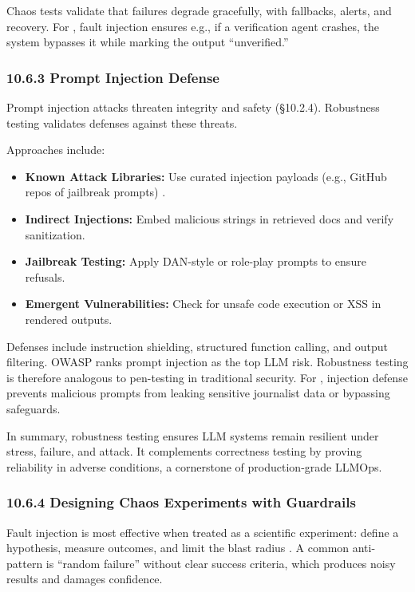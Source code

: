 Chaos tests validate that failures degrade gracefully, with fallbacks, alerts, and recovery. For \ishtar{}, fault injection ensures e.g., if a verification agent crashes, the system bypasses it while marking the output “unverified.”  

\subsubsection*{10.6.3 Prompt Injection Defense}
Prompt injection attacks threaten integrity and safety (§10.2.4). Robustness testing validates defenses against these threats.  

Approaches include:  
\begin{itemize}
    \item \textbf{Known Attack Libraries:} Use curated injection payloads (e.g., GitHub repos of jailbreak prompts) \cite{githubPromptInj}.  
    \item \textbf{Indirect Injections:} Embed malicious strings in retrieved docs and verify sanitization.  
    \item \textbf{Jailbreak Testing:} Apply DAN-style or role-play prompts to ensure refusals.  
    \item \textbf{Emergent Vulnerabilities:} Check for unsafe code execution or XSS in rendered outputs.  
\end{itemize}

Defenses include instruction shielding, structured function calling, and output filtering. OWASP ranks prompt injection as the top LLM risk. Robustness testing is therefore analogous to pen-testing in traditional security. For \ishtar{}, injection defense prevents malicious prompts from leaking sensitive journalist data or bypassing safeguards.  

In summary, robustness testing ensures LLM systems remain resilient under stress, failure, and attack. It complements correctness testing by proving reliability in adverse conditions, a cornerstone of production-grade LLMOps.


\subsubsection*{10.6.4 Designing Chaos Experiments with Guardrails}
Fault injection is most effective when treated as a scientific experiment: define a hypothesis, measure outcomes, and limit the blast radius \cite{basiri2016chaos}.
A common anti-pattern is ``random failure'' without clear success criteria, which produces noisy results and damages confidence.

